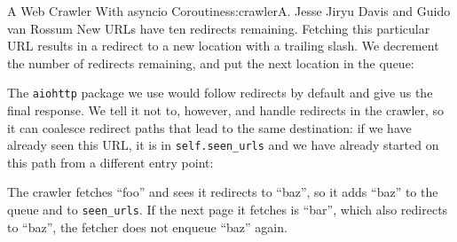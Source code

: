 \begin{aosachapter}{A Web Crawler With asyncio Coroutines}{s:crawler}{A. Jesse Jiryu Davis and Guido van Rossum}
New URLs have ten redirects remaining. Fetching this particular URL
results in a redirect to a new location with a trailing slash. We
decrement the number of redirects remaining, and put the next location
in the queue:

\begin{Shaded}
\begin{Highlighting}[]
\NormalTok{(}\NormalTok{, }\NormalTok{)}
\end{Highlighting}
\end{Shaded}

The \texttt{aiohttp} package we use would follow redirects by default
and give us the final response. We tell it not to, however, and handle
redirects in the crawler, so it can coalesce redirect paths that lead to
the same destination: if we have already seen this URL, it is in
\texttt{self.seen\_urls} and we have already started on this path from a
different entry point:


The crawler fetches ``foo'' and sees it redirects to ``baz'', so it adds
``baz'' to the queue and to \texttt{seen\_urls}. If the next page it
fetches is ``bar'', which also redirects to ``baz'', the fetcher does
not enqueue ``baz'' again.

\begin{Shaded}
\begin{Highlighting}[]
     
          
            \NormalTok{)}

         
             \NormalTok{:}
                \NormalTok{next_url = response.headers[}\NormalTok{]}
                 

                

\end{Highlighting}
\end{Shaded}
\end{aosachapter}
